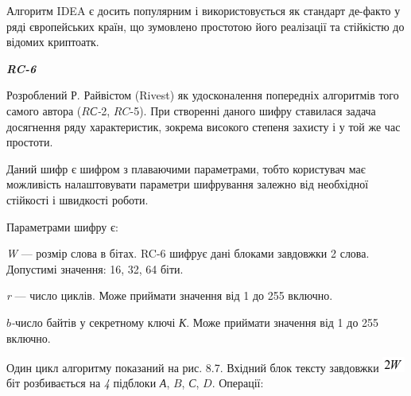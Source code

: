 {{\bigskip

Алгоритм IDEA є досить популярним і використовується як стандарт де-факто у ряді
європейських країн, що зумовлено простотою його реалізації та стійкістю до
відомих криптоатк.


\bigskip


\bigskip

{\centering\bfseries\itshape
RC-6
\par}


\bigskip

Розроблений Р. Райвістом (Rivest) як удосконалення попередніх алгоритмів того
самого автора ($R$\textit{С-}2, $RC$-5). При створенні даного
шифру ставилася задача досягнення ряду характеристик, зокрема високого степеня
захисту і у той же час простоти.


\bigskip

Даний шифр є шифром з плаваючими параметрами, тобто користувач має можливість
налаштовувати параметри шифрування залежно від необхідної стійкості і швидкості
роботи.

Параметрами шифру є: 

\liststyleWWviiiNumxlii
\beginitemize}
\item \textit{W }--- розмір слова в бітах. RC-6 шифрує дані блоками завдовжки 2
слова. Допустимі значення: 16, 32, 64 біти.
\item \textit{r }--- число циклів. Може приймати значення від 1 до 255 включно.
\item $b$\textit{{}-}число байтів у секретному ключі
\textit{К}. Може приймати значення від 1 до 255 включно.
\enditemize}
Один цикл алгоритму показаний на рис. 8.7. Вхідний блок тексту завдовжки 
\includegraphics[width=0.2917in,height=0.1937in]{crypt-img/crypt-img304.png} 
біт розбивається на \textit{4 }підблоки \textit{А}, $B$, \textit{С},
$D$. Операції:

